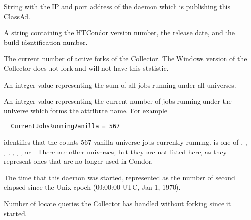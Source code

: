 \begin{description}

\item[\AdAttr{CollectorIpAddr}:] String with the IP and port address of the
   daemon which is publishing this ClassAd.

\item[\AdAttr{CondorVersion}:] A string containing the HTCondor version
number, the release date, and the build identification number.

\item[\AdAttr{CondorVersion}:] The current number of active forks of the Collector.
The Windows version of the Collector does not fork and will not have this statistic.

\item[\AdAttr{CurrentJobsRunningAll}:] An integer value representing the sum of
  all jobs running under all universes.

\item[\AdAttr{CurrentJobsRunning<universe>}:] An integer value representing
  the current number of jobs running under the universe which forms 
  the attribute name.  For example
\begin{verbatim}
  CurrentJobsRunningVanilla = 567
\end{verbatim}
  identifies that the  counts 567 vanilla universe jobs
  currently running.
   is one of 
  , , , ,
  , , , or .
  There are other universes, but they are not listed here, as they represent
  ones that are no longer used in Condor.

\item[\AdAttr{DaemonStartTime}:] The time that this daemon was
  started, represented as the number of second elapsed since
  the Unix epoch (00:00:00 UTC, Jan 1, 1970).

\item[\AdAttr{HandleLocate}:] Number of locate queries the Collector has handled without forking since it started.


\end{description}
